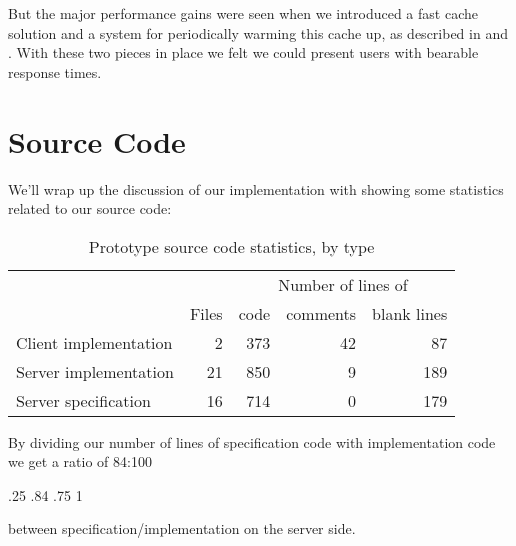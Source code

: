 But the major performance gains were seen when we introduced a fast cache
solution and a system for periodically warming this cache up,
as described in
 and
.
With these two pieces in place we felt we could present users with bearable
response times.

\section{Source Code}
\label{section:implementation.source.code}

We'll wrap up the discussion of our implementation with showing some
statistics related to our source code:

\begin{table}[h]
  \begin{tabular}{lrrrr}

    &
    &
    \multicolumn{3}{c}{Number of lines of} \\

    &
    \multicolumn{1}{c}{Files} &
    \multicolumn{1}{c}{code} &
    \multicolumn{1}{c}{comments} &
    \multicolumn{1}{c}{blank lines} \\

    \cmidrule(lr){2-2}
    \cmidrule(lr){3-5}

    Client implementation &
    2 &
    373 &
    42 &
    87 \\

    Server implementation &
    21 &
    850 &
    9 &
    189 \\

    Server specification &
    16 &
    714 &
    0 &
    179 \\

  \end{tabular}
  \caption[Prototype Source Code Statistics]{%
    Prototype source code statistics, by type}
  \label{table:prototype.source.code.stats}
\end{table}

By dividing our number of lines of specification code with implementation code
we get a ratio of 84:100
\begin{sparkline}{3}
  \sparkspike .25  .84
  \sparkspike .75  1
\end{sparkline}
between specification/implementation on the server side.

